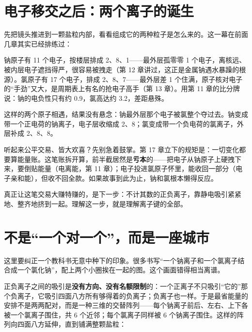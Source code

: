\section{电子移交之后：两个离子的诞生}

先把镜头推进到一颗盐粒内部，看看组成它的两种粒子是怎么来的。这一幕在前面几章其实已经排练过：

钠原子有 11 个电子，按楼层排成 2、8、1——最外层孤零零 1 个电子，离核远、被内层电子遮挡得严，很容易被拽走（第 12 章讲过，这正是金属钠遇水暴躁的根源）。氯原子有 17 个电子，排成 2、8、7——最外层差 1 个住满，原子核对电子的“手劲”又大，是周期表上有名的抢电子高手（第 13 章）。用第 11 章的比分牌说：钠的电负性只有约 0.9，氯高达约 3.2，差距悬殊。

这样的两个原子相遇，结果没有悬念：钠最外层那个电子被氯整个夺过去。钠变成带一个正电荷的钠离子，电子层收缩成 2、8；氯变成带一个负电荷的氯离子，外层补成 2、8、8。

听起来公平交易、皆大欢喜？先别急着鼓掌。第 17 章立下的规矩是：一切变化都要算能量账。这笔账拆开算，前半截居然是\textbf{亏本}的——把电子从钠原子上硬拽下来，要倒贴能量（电离能，第 11 章）；电子投进氯原子怀里，能收回一部分（电子亲和能），但收不回全款。如果故事到此为止，钠和氯根本懒得反应。

真正让这笔交易大赚特赚的，是下一步：不计其数的正负离子，靠静电吸引紧紧地、整齐地挤到一起。理解这一步，就是理解离子键的全部。

\section{不是“一个对一个”，而是一座城市}

这里要纠正一个教科书无意中种下的印象。很多书写“一个钠离子和一个氯离子结合成一个氯化钠”，配上两个小圈挨在一起的图。这个画面错得相当离谱。

正负离子之间的吸引是\textbf{没有方向、没有名额限制}的：一个正离子不只吸引“它的”那个负离子，它吸引四面八方所有够得着的负离子；负离子也一样。于是最省能量的安排不是两两配对，而是一种三维的交替阵列——每个钠离子前后、左右、上下各被一个氯离子围住，共 6 个近邻；每个氯离子同样被 6 个钠离子围住。这样的阵列向四面八方延伸，直到铺满整颗盐粒：

\begin{center}
\end{center}

